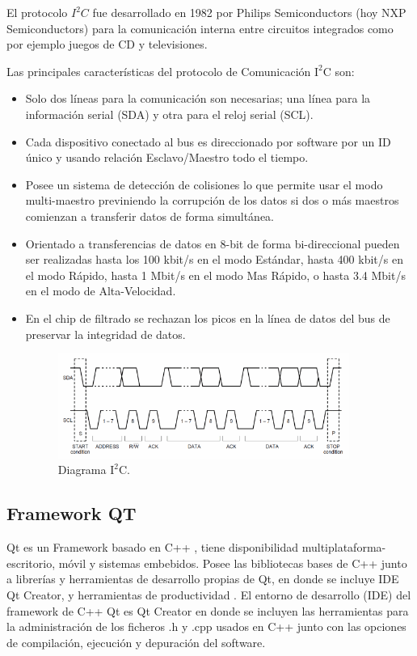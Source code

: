 \documentclass[12pt,a4paper]{article}
\begin{document}
El protocolo $I^2C$ fue desarrollado en 1982 por Philips Semiconductors (hoy NXP Semiconductors) para la comunicación interna entre circuitos integrados como por ejemplo juegos de CD y televisiones.

Las principales características del protocolo de Comunicación $\mathrm{I^2C}$ \cite{I2C} son:
\begin{itemize}
	\item Solo dos líneas para la comunicación son necesarias; una línea para la información serial (SDA) y otra para el reloj serial (SCL).
	
	\item Cada dispositivo conectado al bus es direccionado por software por un ID único y usando relación Esclavo/Maestro todo el tiempo.
	
	\item Posee un sistema de detección de colisiones lo que permite usar el modo multi-maestro previniendo la corrupción de los datos si dos o más maestros comienzan a transferir datos de forma simultánea.
	
	\item Orientado a transferencias de datos en 8-bit de forma bi-direccional pueden ser realizadas hasta los 100 kbit/s en el modo Estándar, hasta 400 kbit/s en el modo Rápido, hasta 1 Mbit/s en el modo Mas Rápido, o hasta 3.4 Mbit/s en el modo de Alta-Velocidad.
	
	\item En el chip de filtrado se rechazan los picos en la línea de datos del bus de preservar la integridad de datos.
	
	\begin{figure}[H]
		\centering
		\includegraphics[width=0.9\textwidth]{images/Diagrama_I2C}
		\caption{Diagrama $\mathrm{I^2C.}$}
		\label{fig:diagramaI2C}
	\end{figure}
\end{itemize}


\subsection{Framework QT}
Qt es un Framework basado en C++ \cite{QT}, tiene disponibilidad multiplataforma- escritorio, móvil y sistemas embebidos.
Posee las bibliotecas bases de C++  junto a librerías y herramientas de desarrollo propias de Qt, en donde se incluye IDE Qt Creator, y herramientas de productividad .
El entorno de desarrollo (IDE) del framework de C++ Qt  es Qt Creator en donde se incluyen las herramientas para la administración de los ficheros .h y .cpp usados en C++ junto con las opciones de compilación, ejecución y depuración del software.
\end{document}
